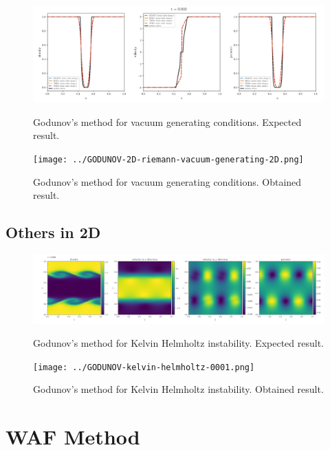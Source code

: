     \begin{figure}[htbp]
        \centering
        \includegraphics[width=.9\textwidth]{./figures/GODUNOV-riemann-vacuum-generating-2D.png}%
        \caption{Godunov's method for vacuum generating conditions. Expected result.}
        \texttt{[image: ../GODUNOV-2D-riemann-vacuum-generating-2D.png]}%
        \caption{Godunov's method for vacuum generating conditions. Obtained result.}
    \end{figure}







\clearpage
\subsection{Others in 2D}

    \begin{figure}[htbp]
        \centering
        \includegraphics[width=.9\textwidth]{./figures/GODUNOV-kelvin-helmholtz-0001.png}%
        \caption{Godunov's method for Kelvin Helmholtz instability. Expected result.}
        \texttt{[image: ../GODUNOV-kelvin-helmholtz-0001.png]}%
        \caption{Godunov's method for Kelvin Helmholtz instability. Obtained result.}
    \end{figure}












\clearpage
\section{WAF Method}

